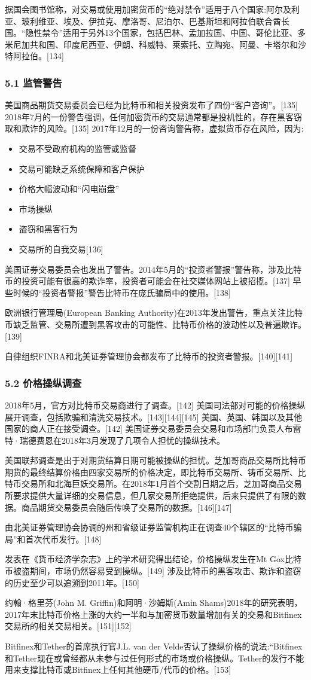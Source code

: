 据国会图书馆称，对交易或使用加密货币的“绝对禁令”适用于八个国家:阿尔及利亚、玻利维亚、埃及、伊拉克、摩洛哥、尼泊尔、巴基斯坦和阿拉伯联合酋长国。“隐性禁令”适用于另外13个国家，包括巴林、孟加拉国、中国、哥伦比亚、多米尼加共和国、印度尼西亚、伊朗、科威特、莱索托、立陶宛、阿曼、卡塔尔和沙特阿拉伯。[134]
\subsubsection{5.1 监管警告}
美国商品期货交易委员会已经为比特币和相关投资发布了四份“客户咨询”。[135] 2018年7月的一份警告强调，任何加密货币的交易通常都是投机性的，存在黑客窃取和欺诈的风险。[135] 2017年12月的一份咨询警告称，虚拟货币存在风险，因为:
\begin{itemize}
\item 交易不受政府机构的监管或监督
\item 交易可能缺乏系统保障和客户保护
\item 价格大幅波动和“闪电崩盘”
\item 市场操纵
\item 盗窃和黑客行为
\item 交易所的自我交易[136]
\end{itemize}
美国证券交易委员会也发出了警告。2014年5月的“投资者警报”警告称，涉及比特币的投资可能有很高的欺诈率，投资者可能会在社交媒体网站上被招揽。[137] 早些时候的“投资者警报”警告比特币在庞氏骗局中的使用。[138]

欧洲银行管理局(European Banking Authority)在2013年发出警告，重点关注比特币缺乏监管、交易所遭到黑客攻击的可能性、比特币价格的波动性以及普遍欺诈。[139]

自律组织FINRA和北美证券管理协会都发布了比特币的投资者警报。[140][141]
\subsubsection{5.2 价格操纵调查}
2018年5月，官方对比特币交易商进行了调查。[142] 美国司法部对可能的价格操纵展开调查，包括欺骗和清洗交易技术。[143][144][145] 美国、英国、韩国以及其他国家的商人正在接受调查。[142] 美国证券交易委员会交易和市场部门负责人布雷特·瑞德费恩在2018年3月发现了几项令人担忧的操纵技术。

美国联邦调查是出于对期货结算日期可能被操纵的担忧。芝加哥商品交易所比特币期货的最终结算价格由四家交易所的价格决定，即比特币交易所、铸币交易所、比特币交易所和北海巨妖交易所。在2018年1月首个交割日期之后，芝加哥商品交易所要求提供大量详细的交易信息，但几家交易所拒绝提供，后来只提供了有限的数据。商品期货交易委员会随后传唤了交易所的数据。[146][147]

由北美证券管理协会协调的州和省级证券监管机构正在调查40个辖区的“比特币骗局”和首次代币发行。[148]

发表在《货币经济学杂志》上的学术研究得出结论，价格操纵发生在Mt Gox比特币被盗期间，市场仍然容易受到操纵。[149] 涉及比特币的黑客攻击、欺诈和盗窃的历史至少可以追溯到2011年。[150]

约翰·格里芬(John M. Griffin)和阿明·沙姆斯(Amin Shams)2018年的研究表明，2017年末比特币价格上涨的大约一半和与加密货币数量增加有关的交易和Bitfinex交易所的相关交易相关。[151][152]

Bitfinex和Tether的首席执行官J.L. van der Velde否认了操纵价格的说法:“Bitfinex和Tether现在或曾经都从未参与过任何形式的市场或价格操纵。Tether的发行不能用来支撑比特币或Bitfinex上任何其他硬币/代币的价格。[153]